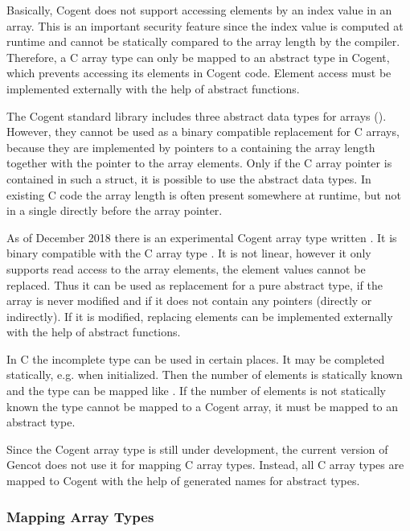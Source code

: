 Basically, Cogent does not support accessing elements by an index value in an array. 
This is an important security feature since the index value is computed at runtime and cannot be statically 
compared to the array length by the compiler. Therefore, a C array type can only be mapped to an abstract type 
in Cogent, which prevents accessing its elements in Cogent code. Element access must be implemented externally 
with the help of abstract functions.

The Cogent standard library includes three abstract data types for arrays (). 
However, they cannot be used as a binary compatible replacement for C arrays, because they are implemented by 
pointers to a  containing the array length together with the pointer to the array elements. 
Only if the C array pointer is contained in such a struct, it is possible to use the abstract data types. 
In existing C code the array length is often present somewhere at runtime, but not in a single 
directly before the array pointer.

As of December 2018 there is an experimental Cogent array type written . It is binary compatible 
with the C array type . It is not linear, however it only supports read access to the array elements, 
the element values cannot be replaced. Thus it can be used as replacement for a pure abstract type, if the array 
is never modified and if it does not contain any pointers (directly or indirectly). If it is modified, replacing
elements can be implemented externally with the help of abstract functions.

In C the incomplete type  can be used in certain places. It may be completed statically, e.g. 
when initialized. Then the number of elements is statically known and the type can be mapped like .
If the number of elements is not statically known the type cannot be mapped to a Cogent array, it must be mapped 
to an abstract type.

Since the Cogent array type is still under development, the current version of Gencot does not use it for
mapping C array types. Instead, all C array types are mapped to Cogent with the help of generated names for 
abstract types.

\subsubsection{Mapping Array Types}

